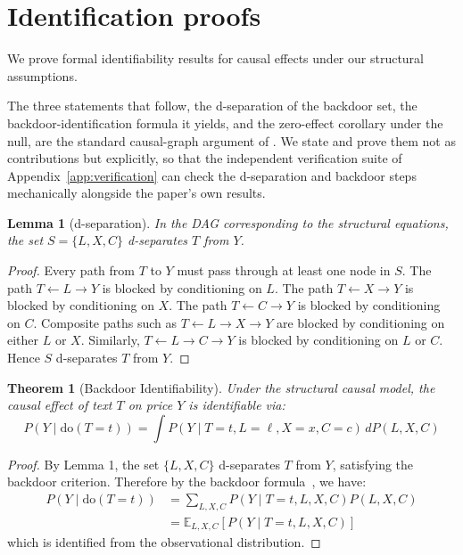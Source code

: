\documentclass{article}
\newtheorem{theorem}{Theorem}
\newtheorem{lemma}{Lemma}
\begin{document}
\section{Identification proofs}
\label{app:proofs}

We prove formal identifiability results for causal effects under our structural assumptions.




The three statements that follow, the d-separation of the backdoor set, the
backdoor-identification formula it yields, and the zero-effect corollary under the
null, are the standard causal-graph argument of \citet{pearl2009causality}. We state
and prove them not as contributions but explicitly, so that the independent
verification suite of Appendix~\ref{app:verification} can check the d-separation and
backdoor steps mechanically alongside the paper's own results.

\begin{lemma}[d-separation]
\label{lemma:dsep}
In the DAG corresponding to the structural equations, the set $S = \{L, X, C\}$ d-separates $T$ from $Y$.
\end{lemma}

\begin{proof}
Every path from $T$ to $Y$ must pass through at least one node in $S$. The path $T \leftarrow L \rightarrow Y$ is blocked by conditioning on $L$. The path $T \leftarrow X \rightarrow Y$ is blocked by conditioning on $X$. The path $T \leftarrow C \rightarrow Y$ is blocked by conditioning on $C$. Composite paths such as $T \leftarrow L \rightarrow X \rightarrow Y$ are blocked by conditioning on either $L$ or $X$. Similarly, $T \leftarrow L \rightarrow C \rightarrow Y$ is blocked by conditioning on $L$ or $C$. Hence $S$ d-separates $T$ from $Y$.
\end{proof}

\begin{theorem}[Backdoor Identifiability]
Under the structural causal model, the causal effect of text $T$ on price $Y$ is identifiable via:
\begin{equation}
P(Y \mid \text{do}(T=t)) = \int P(Y \mid T=t, L=\ell, X=x, C=c) \, dP(L, X, C)
\end{equation}
\end{theorem}

\begin{proof}
By Lemma 1, the set $\{L, X, C\}$ d-separates $T$ from $Y$, satisfying the backdoor criterion. Therefore by the backdoor formula~\citep{pearl2009causality}, we have:
\begin{align}
P(Y \mid \text{do}(T=t)) &= \sum_{L,X,C} P(Y \mid T=t, L, X, C) P(L, X, C)\\
&= \mathbb{E}_{L,X,C}\left[P(Y \mid T=t, L, X, C)\right]
\end{align}
which is identified from the observational distribution.
\end{proof}
\end{document}
